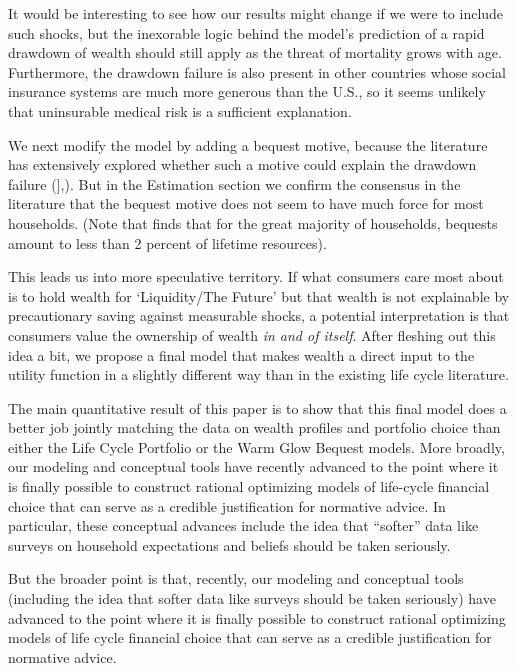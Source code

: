\documentclass{article}
\begin{document}
It would be interesting to see how our results might change if we were to include such shocks, but the inexorable logic behind the model's prediction of a rapid drawdown of wealth should still apply as the threat of mortality grows with age.
Furthermore, the drawdown failure is also present in other countries whose social insurance systems are much more generous than the U.S., so it seems unlikely that uninsurable medical risk is a sufficient explanation.

We next modify the model by adding a bequest motive, because the literature has extensively explored whether such a motive could explain the drawdown failure (\href{@deNardi2004}{}],\cite{DeNardi2016d}).
But in the Estimation section we confirm the consensus in the literature that the bequest motive does not seem to have much force for most households.
(Note that \cite{Hendricks_2002} finds that for the great majority of households, bequests amount to less than 2 percent of lifetime resources).

This leads us into more speculative territory.
If what consumers care most about is to hold wealth for `Liquidity/The Future' but that wealth is not explainable by precautionary saving against measurable shocks, a potential interpretation is that consumers value the ownership of wealth \textit{in and of itself}.
After fleshing out this idea a bit, we propose a final model that makes wealth a direct input to the utility function in a slightly different way than in the existing life cycle literature.

The main quantitative result of this paper is to show that this final model does a better job jointly matching the data on wealth profiles and portfolio choice than either the Life Cycle Portfolio or the Warm Glow Bequest models.
More broadly, our modeling and conceptual tools have recently advanced to the point where it is finally possible to construct rational optimizing models of life-cycle financial choice that can serve as a credible justification for normative advice.
In particular, these conceptual advances include the idea that ``softer'' data like surveys on household expectations and beliefs should be taken seriously.

But the broader point is that, recently, our modeling and conceptual tools (including the idea that softer data like surveys should be taken seriously) have advanced to the point where it is finally possible to construct rational optimizing models of life cycle financial choice that can serve as a credible justification for normative advice.
\end{document}

